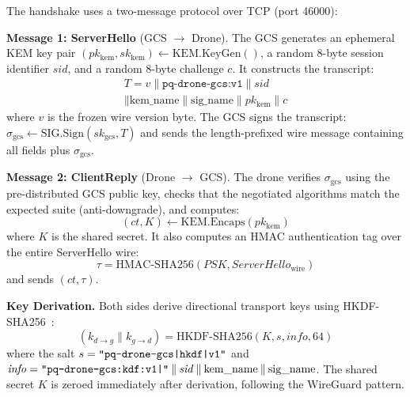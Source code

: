 \documentclass[conference]{IEEEtran}
\begin{document}
The handshake uses a two-message protocol over TCP (port 46000):

\textbf{Message 1: ServerHello} (GCS $\to$ Drone).
The GCS generates an ephemeral KEM key pair $(pk_{\mathrm{kem}}, sk_{\mathrm{kem}}) \gets \mathrm{KEM.KeyGen}()$, a random 8-byte session identifier $\mathit{sid}$, and a random 8-byte challenge $c$.
It constructs the transcript:
\begin{equation}
\label{eq:transcript}
\begin{split}
    T = v \mathbin\| \texttt{pq-drone-gcs:v1} \mathbin\| \mathit{sid} \\
    \mathbin\| \mathrm{kem\_name} \mathbin\| \mathrm{sig\_name} \mathbin\| pk_{\mathrm{kem}} \mathbin\| c
\end{split}
\end{equation}
where $v$ is the frozen wire version byte.
The GCS signs the transcript:
$\sigma_{\mathrm{gcs}} \gets \mathrm{SIG.Sign}(sk_{\mathrm{gcs}}, T)$
and sends the length-prefixed wire message containing all fields plus $\sigma_{\mathrm{gcs}}$.

\textbf{Message 2: ClientReply} (Drone $\to$ GCS).
The drone verifies $\sigma_{\mathrm{gcs}}$ using the pre-distributed GCS public key, checks that the negotiated algorithms match the expected suite (anti-downgrade), and computes:
\begin{equation}
    (\mathit{ct}, K) \gets \mathrm{KEM.Encaps}(pk_{\mathrm{kem}})
\end{equation}
where $K$ is the shared secret.
It also computes an HMAC authentication tag over the entire ServerHello wire:
\begin{equation}
    \tau = \mathrm{HMAC\text{-}SHA256}(\mathit{PSK}, \mathit{ServerHello}_{\mathrm{wire}})
\end{equation}
and sends $(ct, \tau)$.

\textbf{Key Derivation.}
Both sides derive directional transport keys using HKDF-SHA256~\cite{rfc5869}:
\begin{equation}
\label{eq:hkdf}
    (k_{d \to g} \mathbin\| k_{g \to d}) = \mathrm{HKDF\text{-}SHA256}(K, s, \mathit{info}, 64)
\end{equation}
where the salt $s = \texttt{``pq\text{-}drone\text{-}gcs|hkdf|v1''}$ and $\mathit{info} = \texttt{``pq\text{-}drone\text{-}gcs:kdf:v1|''} \mathbin\| \mathit{sid} \mathbin\| \mathrm{kem\_name} \mathbin\| \mathrm{sig\_name}$.
The shared secret $K$ is zeroed immediately after derivation, following the WireGuard pattern.
\end{document}
